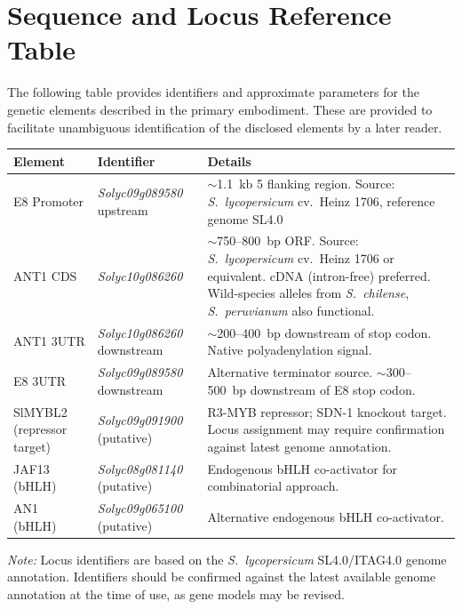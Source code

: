 \documentclass[12pt,a4paper]{article}
\begin{document}
\newpage
\appendix
\section{Sequence and Locus Reference Table}
\label{app:sequences}

The following table provides identifiers and approximate parameters for the genetic elements described in the primary embodiment. These are provided to facilitate unambiguous identification of the disclosed elements by a later reader.

\begin{longtable}{p{3cm} p{3cm} p{7cm}}
\toprule
\textbf{Element} & \textbf{Identifier} & \textbf{Details} \\
\midrule
\endhead
E8 Promoter & \textit{Solyc09g089580} upstream & $\sim$1.1~kb 5\textquotesingle{} flanking region. Source: \textit{S.~lycopersicum} cv.\ Heinz 1706, reference genome SL4.0 \\
\addlinespace
ANT1 CDS & \textit{Solyc10g086260} & $\sim$750--800~bp ORF. Source: \textit{S.~lycopersicum} cv.\ Heinz 1706 or equivalent. cDNA (intron-free) preferred. Wild-species alleles from \textit{S.~chilense}, \textit{S.~peruvianum} also functional. \\
\addlinespace
ANT1 3\textquotesingle{}UTR & \textit{Solyc10g086260} downstream & $\sim$200--400~bp downstream of stop codon. Native polyadenylation signal. \\
\addlinespace
E8 3\textquotesingle{}UTR & \textit{Solyc09g089580} downstream & Alternative terminator source. $\sim$300--500~bp downstream of E8 stop codon. \\
\addlinespace
SlMYBL2 (repressor target) & \textit{Solyc09g091900} (putative) & R3-MYB repressor; SDN-1 knockout target. Locus assignment may require confirmation against latest genome annotation. \\
\addlinespace
JAF13 (bHLH) & \textit{Solyc08g081140} (putative) & Endogenous bHLH co-activator for combinatorial approach. \\
\addlinespace
AN1 (bHLH) & \textit{Solyc09g065100} (putative) & Alternative endogenous bHLH co-activator. \\
\bottomrule
\end{longtable}

\noindent\textit{Note:} Locus identifiers are based on the \textit{S.~lycopersicum} SL4.0/ITAG4.0 genome annotation. Identifiers should be confirmed against the latest available genome annotation at the time of use, as gene models may be revised.

\newpage


\end{document}
